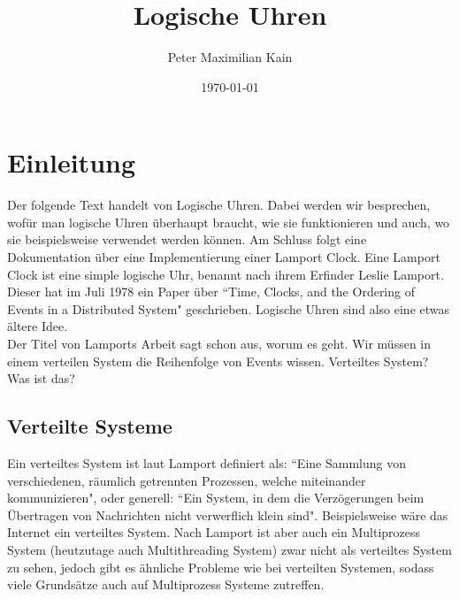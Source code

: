 \documentclass[a4paper,11pt]{report}
\title{Logische Uhren}
\author{Peter Maximilian Kain}
\date{\today}
\begin{document}
\maketitle

\tableofcontents
\newpage

\chapter{Einleitung}
Der folgende Text handelt von Logische Uhren. Dabei werden wir besprechen, wofür man logische Uhren überhaupt braucht, wie sie funktionieren und auch, wo sie beispielsweise verwendet werden können. Am Schluss folgt eine Dokumentation über eine Implementierung einer Lamport Clock. Eine Lamport Clock ist eine simple logische Uhr, benannt nach ihrem Erfinder Leslie Lamport. Dieser hat im Juli 1978 ein Paper über ``Time, Clocks, and the Ordering of Events in a Distributed System" geschrieben. Logische Uhren sind also eine etwas ältere Idee.\\
Der Titel von Lamports Arbeit sagt schon aus, worum es geht. Wir müssen in einem verteilen System die Reihenfolge von Events wissen. Verteiltes System? Was ist das?
\section{Verteilte Systeme}
Ein verteiltes System ist laut Lamport definiert als: ``Eine Sammlung von verschiedenen, räumlich getrennten Prozessen, welche miteinander kommunizieren", oder generell: ``Ein System, in dem die Verzögerungen beim Übertragen von Nachrichten nicht verwerflich klein sind". Beispielsweise wäre das Internet ein verteiltes System. Nach Lamport ist aber auch ein Multiprozess System (heutzutage auch Multithreading System) zwar nicht als verteiltes System zu sehen, jedoch gibt es ähnliche Probleme wie bei verteilten Systemen, sodass viele Grundsätze auch auf Multiprozess Systeme zutreffen.
\end{document}
